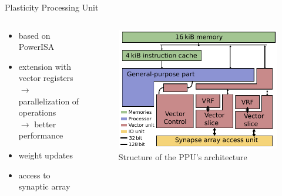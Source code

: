 \documentclass[10pt,aspectratio=169]{beamer}
\begin{document}
\begin{frame}{Plasticity Processing Unit}
    \begin{columns}[c]
    \begin{column}{0.5\textwidth}
        \begin{itemize}
			\setlength\itemsep{1em}
			\item based on PowerISA
            \item extension with vector registers \\ \hspace{10mm}
				$\rightarrow$ parallelization of operations\\ \hspace{10mm}
				$\rightarrow$ better performance
            \item weight updates
			\item access to synaptic array
        \end{itemize}
    \end{column}

    \begin{column}{0.5\textwidth}
        \centering
        \begin{figure}
            \includegraphics[width=.8\textwidth]{pictures/nux.pdf}
            \caption{\label{fig:nux} Structure of the PPU's architecture}
        \end{figure}
    \end{column}
    \end{columns}
\end{frame}
\end{document}
